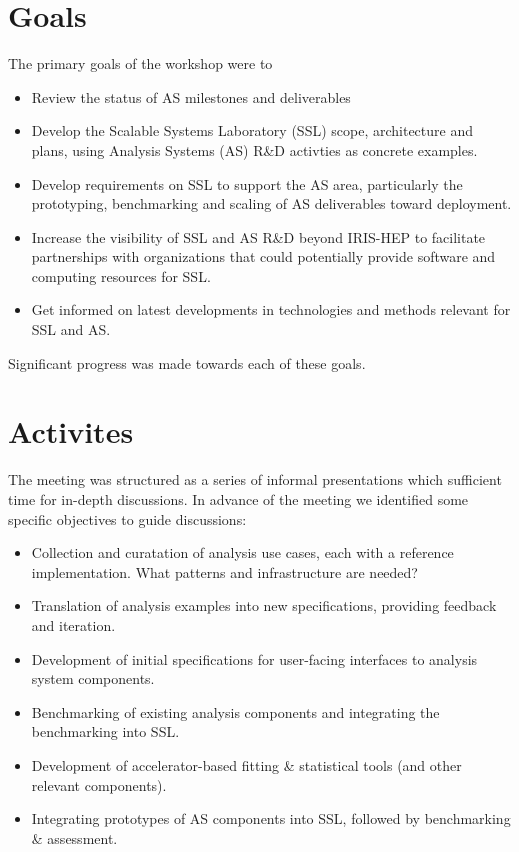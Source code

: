 \documentclass[11pt,letterpaper,fleqn]{article}
\begin{document}
\section{Goals}
The primary goals of the workshop were to
\begin{itemize}
  \item Review the status of AS milestones and deliverables
  \item Develop the Scalable Systems Laboratory (SSL) scope, architecture and plans, using Analysis Systems (AS) R\&D activties as concrete examples.
  \item Develop requirements on SSL to support the AS area, particularly the prototyping, benchmarking and scaling of AS deliverables toward deployment.
  \item Increase the visibility of SSL and AS R\&D beyond IRIS-HEP to facilitate partnerships with organizations that could potentially provide software and computing resources for SSL.
  \item Get informed on latest developments in technologies and methods relevant for SSL and AS.
\end{itemize}
Significant progress was made towards each of these goals. 


\section{Activites}

The meeting was structured as a series of informal presentations which sufficient time for in-depth discussions.  In advance of the meeting we identified some specific objectives to guide discussions:

\begin{itemize}
  \item Collection and curatation of analysis use cases, each with a reference implementation.  What patterns and infrastructure are needed?
  \item Translation of analysis examples into new specifications, providing feedback and iteration.
  \item Development of initial specifications for user-facing interfaces to analysis system components.
  \item Benchmarking of existing analysis components and integrating the benchmarking into SSL.
  \item Development of accelerator-based fitting \& statistical tools (and other relevant components).
  \item Integrating prototypes of AS components into SSL, followed by benchmarking \& assessment.
\end{itemize}
\end{document}
